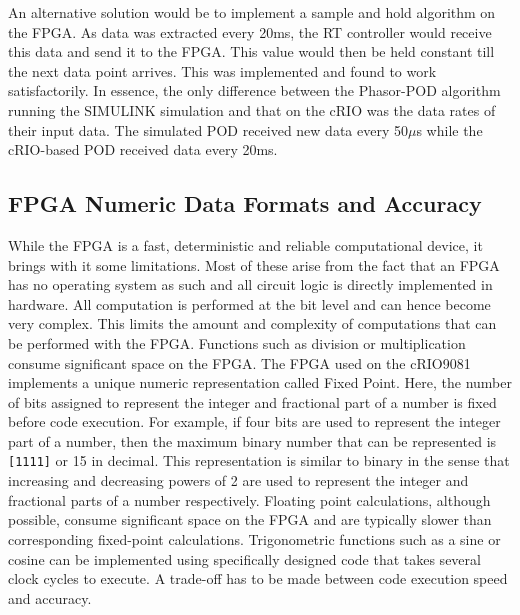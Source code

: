 \documentclass[journal]{IEEEtran}
\begin{document}
An alternative solution would be to implement a sample and hold algorithm on the FPGA. As data was extracted every 20ms, the RT controller would receive this data and send it to the FPGA. This value would then be held constant till the next data point arrives. This was implemented and found to work satisfactorily. In essence, the only difference between the Phasor-POD algorithm running the SIMULINK simulation and that on the cRIO was the data rates of their input data. The simulated POD received new data every 50$\mu$s while the cRIO-based POD received data every 20ms.

\subsection{FPGA Numeric Data Formats and Accuracy}

While the FPGA is a fast, deterministic and reliable computational device, it brings with it some limitations. Most of these arise from the fact that an FPGA has no operating system as such and all circuit logic is directly implemented in hardware. All computation is performed at the bit level and can hence become very complex. This limits the amount and complexity of computations that can be performed with the FPGA. Functions such as division or multiplication consume significant space on the FPGA\cite{LabVIEWCourse}. The FPGA used on the cRIO9081 implements a unique numeric representation called Fixed Point\cite{LabViewManuals}. Here, the number of bits assigned to represent the integer and fractional part of a number is fixed before code execution\cite{LabVIEWCourse}. For example, if four bits are used to represent the integer part of a number, then the maximum binary number that can be represented is \texttt{[1111]} or 15 in decimal. This representation is similar to binary in the sense that increasing and decreasing powers of 2 are used to represent the integer and fractional parts of a number respectively. Floating point calculations, although possible, consume significant space on the FPGA and are typically slower than corresponding fixed-point calculations\cite{LabVIEWCourse}. Trigonometric functions such as a sine or cosine can be implemented using specifically designed code that takes several clock cycles to execute. A trade-off has to be made between code execution speed and accuracy.\\
\end{document}
